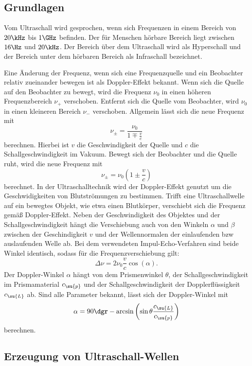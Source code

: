 \subsection{Grundlagen}
Vom Ultraschall wird gesprochen, wenn sich Frequenzen in einem Bereich von
$20\kHz$ bis $1\GHz$ befinden. Der für Menschen hörbare Bereich liegt zwischen
$16\Hz$ und $20\kHz$. Der Bereich über dem Ultraschall wird als Hyperschall und
der Bereich unter dem hörbaren Bereich als Infraschall bezeichnet.

Eine Änderung der Frequenz, wenn sich eine Frequenzquelle und ein Beobachter
relativ zueinander bewegen ist als Doppler-Effekt bekannt. Wenn sich die Quelle
auf den Beobachter zu bewegt, wird die Frequenz $\nu_0$ in einen höheren
Frequenzbereich $\nu_+$ verschoben. Entfernt sich die Quelle vom Beobachter,
wird $\nu_0$ in einen kleineren Bereich $\nu_-$ verschoben. Allgemein lässt
sich die neue Frequenz mit
\begin{equation}
  \nu_\pm = \frac{\nu_0}{1\mp\frac{v}{c}}
\end{equation}
berechnen. Hierbei ist $v$ die Geschwindigkeit der Quelle und $c$ die
Schallgeschwindigkeit im Vakuum.
Bewegt sich der Beobachter und die Quelle ruht, wird die neue Frequenz mit
\begin{equation}
  \nu_\pm=\nu_0\left(1\pm\frac{v}{c}\right)
\end{equation}
berechnet. In der Ultraschalltechnik wird der Doppler-Effekt genutzt um die
Geschwidigkeiten von Blutströmungen zu bestimmen. Trifft eine Ultraschallwelle
auf ein bewegtes Objekt, wie etwa einen Blutkörper, verschiebt sich die Frequenz
gemäß Doppler-Effekt. Neben der Geschwindigkeit des Objektes und der
Schallgeschwindigkeit hängt die Verschiebung auch von den Winkeln $\alpha$ und
$\beta$ zwischen der Geschindigkeit $v$ und der Wellennormalen der einlaufenden
bzw auslaufenden Welle ab. Bei dem verwendeten Impul-Echo-Verfahren sind beide
Winkel identisch, sodass für die Frequenzverschiebung gilt:
\begin{equation}
  \Delta\nu = 2\nu_0\frac{v}{c}\cos(\alpha).
  \label{eqn:deltanu}
\end{equation}
Der Doppler-Winkel $\alpha$ hängt von dem Prismenwinkel $\theta$, der
Schallgeschwindigkeit im Prismamaterial $c_\su{p}$ und der Schallgeschwindigkeit
der Dopplerflüssigkeit $c_\su{L}$ ab. Sind alle Parameter bekannt, lässt sich
der Doppler-Winkel mit
\begin{equation}
  \alpha = 90\dgr -\arcsin\left(\sin\theta\frac{c_\su{L}}{c_\su{p}}\right)
  \label{eqn:alpha}
\end{equation}
berechnen.
\subsection{Erzeugung von Ultraschall-Wellen}
